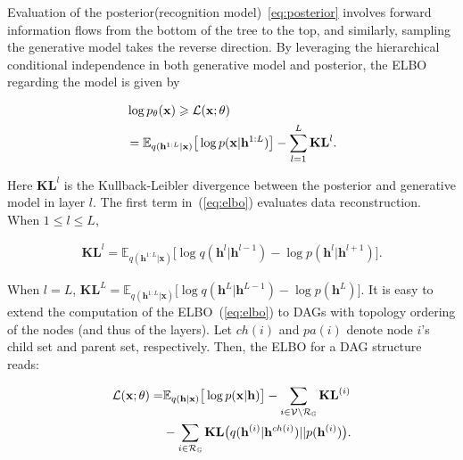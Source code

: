 \documentclass[sigconf, anonymous, review]{acmart}
\theoremstyle{plain}
\theoremstyle{definition}
\theoremstyle{remark}
\begin{document}
\vspace{-0.15in}
\noindent Evaluation of the posterior(recognition model)~\eqref{eq:posterior} involves forward information flows from the bottom of the tree to the top, and similarly, sampling  the generative model takes the reverse direction. By leveraging the hierarchical conditional independence in both  generative model and  posterior,  the ELBO regarding the model is given by 

\vspace{-0.15in}
\begin{align} \label{eq:elbo}
&\log p_{\theta}(\mathbf{x})
    \geqslant \mathcal{L}(\mathbf{x}; \theta) \\ \notag
&= \mathbb{E}_{q(\mathbf{h}^{1:L}|\mathbf{x})}\big[ \log p(\mathbf{x}|\mathbf{h}^{1:L})  \big] - \sum_{l=1}^{L} \mathbf{KL}^l.
\end{align}
\vspace{-0.15in}

\noindent Here $\mathbf{KL}^l$ is the Kullback-Leibler divergence between the posterior and generative model in layer $l$. The first term in~(\ref{eq:elbo}) evaluates data reconstruction.  
When $1\leqslant l \leqslant L$, 

\vspace{-0.15in}
\begin{align}\label{eq:kl}
\mathbf{KL}^l 
=\mathbb{E}_{q(\mathbf{h}^{1:L}|\mathbf{x})}\big[  \log q(\mathbf{h}^{l}|\mathbf{h}^{l-1})   - \log p(\mathbf{h}^{l}|\mathbf{h}^{l+1}) \big].
\end{align}
\vspace{-0.15in}

\noindent When $l=L$, 
$\mathbf{KL}^L =  \mathbb{E}_{q(\mathbf{h}^{1:L}|\mathbf{x})}\big[  \log q(\mathbf{h}^{L}|\mathbf{h}^{L-1})- \log p(\mathbf{h}^{L})  \big].$ It is easy to extend the computation of the ELBO~(\ref{eq:elbo}) to DAGs with topology ordering of the nodes (and thus of the layers). 
Let $ch(i)$ and $pa(i)$ denote node $i$'s child set and parent set, respectively.
Then, the ELBO for a DAG structure reads:

\vspace{-0.15in}
\begin{align}\label{eq:elbo_dag}
\mathcal{L}(\mathbf{x}; \theta) =& \mathbb{E}_{q(\mathbf{h}|\mathbf{x})}\big[ \log p(\mathbf{x}|\mathbf{h})  \big] -  \sum_{i \in \mathcal{V}  \setminus  \mathcal{R}_{ \mathbb{G} }} \textbf{\text{KL}}^{(i)}  \\ \notag
&-    \sum_{i \in  \mathcal{R}_{ \mathbb{G} }  }  \textbf{\text{KL}}\big(q(\mathbf{h}^{(i)} | \mathbf{h}^{ch(i)} )   || p(\mathbf{h}^{(i)})  \big) .
\end{align}
\vspace{-0.15in}
\end{document}
